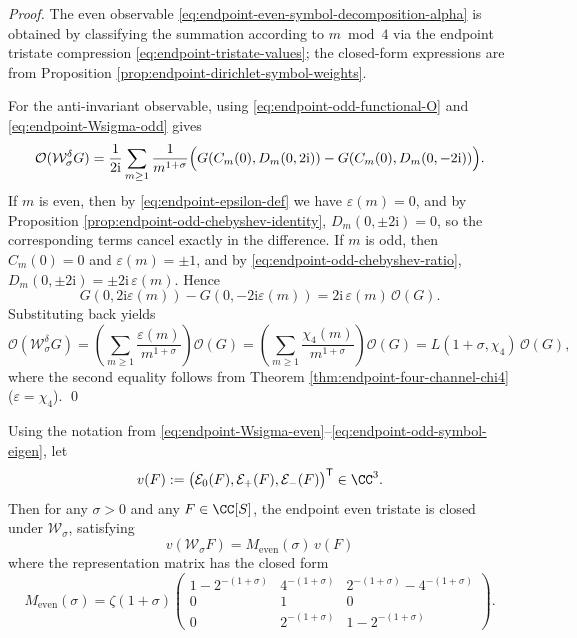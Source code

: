 \begin{proof}
The even observable \eqref{eq:endpoint-even-symbol-decomposition-alpha} is obtained by classifying the summation according to \(m\bmod 4\) via the endpoint tristate compression \eqref{eq:endpoint-tristate-values}; the closed-form expressions are from Proposition \ref{prop:endpoint-dirichlet-symbol-weights}.
\par
For the anti-invariant observable, using \eqref{eq:endpoint-odd-functional-O} and \eqref{eq:endpoint-Wsigma-odd} gives
\[
\mathcal O(\mathcal W_{\sigma}^{\delta}G)
=\frac{1}{2\mathrm{i}}\sum_{m\ge 1}\frac{1}{m^{1+\sigma}}
\Bigl(G(C_m(0),D_m(0,2\mathrm{i}))-G(C_m(0),D_m(0,-2\mathrm{i}))\Bigr).
\]
If \(m\) is even, then by \eqref{eq:endpoint-epsilon-def} we have \(\varepsilon(m)=0\), and by Proposition \ref{prop:endpoint-odd-chebyshev-identity}, \(D_m(0,\pm 2\mathrm{i})=0\), so the corresponding terms cancel exactly in the difference.
If \(m\) is odd, then \(C_m(0)=0\) and \(\varepsilon(m)=\pm 1\), and by \eqref{eq:endpoint-odd-chebyshev-ratio},
\(
D_m(0,\pm 2\mathrm{i})=\pm 2\mathrm{i}\,\varepsilon(m)
\).
Hence
\[
G(0,2\mathrm{i}\varepsilon(m))-G(0,-2\mathrm{i}\varepsilon(m))
=2\mathrm{i}\,\varepsilon(m)\,\mathcal O(G).
\]
Substituting back yields
\[
\mathcal O(\mathcal W_{\sigma}^{\delta}G)
=\left(\sum_{m\ge 1}\frac{\varepsilon(m)}{m^{1+\sigma}}\right)\mathcal O(G)
=\left(\sum_{m\ge 1}\frac{\chi_{4}(m)}{m^{1+\sigma}}\right)\mathcal O(G)
=L(1+\sigma,\chi_{4})\,\mathcal O(G),
\]
where the second equality follows from Theorem \ref{thm:endpoint-four-channel-chi4} (\(\varepsilon=\chi_4\)). \qed
\end{proof}

\begin{proposition}\label{prop:endpoint-even-tristate-matrix}
Using the notation from \eqref{eq:endpoint-Wsigma-even}--\eqref{eq:endpoint-odd-symbol-eigen}, let
\[
v(F):=\bigl(\mathcal E_{0}(F),\mathcal E_{+}(F),\mathcal E_{-}(F)\bigr)^{\mathsf T}\in\CC^{3}.
\]
Then for any \(\sigma>0\) and any \(F\in\CC[S]\), the endpoint even tristate is closed under \(\mathcal W_\sigma\), satisfying
\begin{equation}\label{eq:endpoint-even-tristate-matrix-action}
\boxed{\;
v(\mathcal W_{\sigma}F)=M_{\mathrm{even}}(\sigma)\,v(F)\;}
\end{equation}
where the representation matrix has the closed form
\begin{equation}\label{eq:endpoint-even-tristate-matrix-closed}
\boxed{\;
M_{\mathrm{even}}(\sigma)
=\zeta(1+\sigma)
\begin{pmatrix}
1-2^{-(1+\sigma)} & 4^{-(1+\sigma)} & 2^{-(1+\sigma)}-4^{-(1+\sigma)}\\
0&1&0\\
0&2^{-(1+\sigma)}&1-2^{-(1+\sigma)}
\end{pmatrix}. \;}
\end{equation}
\end{proposition}


